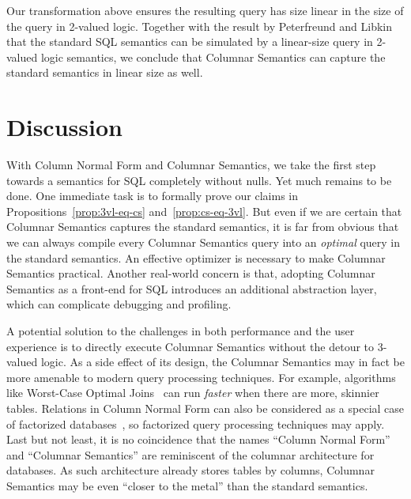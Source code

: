 \documentclass[sigconf,nonacm]{acmart}
\begin{document}
Our transformation above ensures the resulting query 
 has size linear in the size of the query in 2-valued logic.
Together with the result by Peterfreund and Libkin~\cite{DBLP:conf/pods/LibkinP23}
 that the standard SQL semantics can be simulated by 
 a linear-size query in 2-valued logic semantics,
 we conclude that Columnar Semantics 
 can capture the standard semantics in linear size as well.


\section{Discussion}
\label{sec:conclusion}

With Column Normal Form and Columnar Semantics, 
 we take the first step towards a semantics for SQL
 completely without nulls.
Yet much remains to be done.
One immediate task is to formally prove our claims
 in Propositions~\ref{prop:3vl-eq-cs} and~\ref{prop:cs-eq-3vl}.
But even if we are certain that Columnar Semantics 
 captures the standard semantics,
 it is far from obvious that 
 we can always compile every Columnar Semantics query 
 into an {\em optimal} query in the standard semantics.
An effective optimizer is necessary to make 
 Columnar Semantics practical.
Another real-world concern is that,
 adopting Columnar Semantics 
 as a front-end for SQL introduces an additional abstraction layer,
 which can complicate debugging and profiling.

A potential solution to the challenges in 
 both performance and the user experience
 is to directly execute Columnar Semantics
 without the detour to 3-valued logic.
As a side effect of its design, the Columnar Semantics
 may in fact be more amenable to modern query processing techniques.
For example, algorithms like Worst-Case Optimal Joins~\cite{DBLP:journals/jacm/NgoPRR18}
 can run {\em faster} when there are more, skinnier tables. 
Relations in Column Normal Form can also be considered 
 as a special case of factorized databases~\cite{DBLP:journals/sigmod/OlteanuS16}, 
 so factorized query processing techniques may apply.
Last but not least, 
 it is no coincidence that the names ``Column Normal Form'' and ``Columnar Semantics''
 are reminiscent of the columnar architecture for databases.
As such architecture already stores tables by columns, 
 Columnar Semantics may be even ``closer to the metal'' 
 than the standard semantics.
\end{document}
